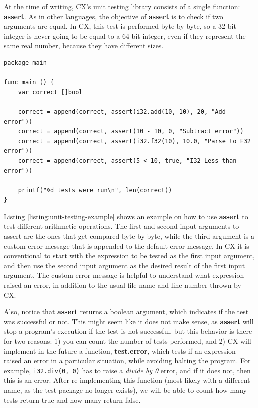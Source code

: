 \documentclass[11pt,fleqn,openany]{book} %
\begin{document}
At the time of writing, CX's unit testing library consists of a single function: \textbf{assert}. As in other languages, the objective of \textbf{assert} is to check if two arguments are equal. In CX, this test is performed byte by byte, so a 32-bit integer is never going to be equal to a 64-bit integer, even if they represent the same real number, because they have different sizes.

\begin{lstlisting}[caption={Testing using assert},captionpos=b,label={listing:unit-testing-example}]
package main

func main () {
	var correct []bool

	correct = append(correct, assert(i32.add(10, 10), 20, "Add error"))
	correct = append(correct, assert(10 - 10, 0, "Subtract error"))
	correct = append(correct, assert(i32.f32(10), 10.0, "Parse to F32 error"))
	correct = append(correct, assert(5 < 10, true, "I32 Less than error"))

	printf("%d tests were run\n", len(correct))
}
\end{lstlisting}

Listing \ref{listing:unit-testing-example} shows an example on how to use \textbf{assert} to test different arithmetic operations. The first and second input arguments to assert are the ones that get compared byte by byte, while the third argument is a custom error message that is appended to the default error message. In CX it is conventional to start with the expression to be tested as the first input argument, and then use the second input argument as the desired result of the first input argument. The custom error message is helpful to understand what expression raised an error, in addition to the usual file name and line number thrown by CX.

Also, notice that \textbf{assert} returns a boolean argument, which indicates if the test was successful or not. This might seem like it does not make sense, as \textbf{assert} will stop a program's execution if the test is not successful, but this behavior is there for two reasons: 1) you can count the number of tests performed, and 2) CX will implement in the future a function, \textbf{test.error}, which tests if an expression raised an error in a particular situation, while avoiding halting the program. For example, \lstinline{i32.div(0, 0)} has to raise a \emph{divide by 0} error, and if it does not, then this is an error. After re-implementing this function (most likely with a different name, as the test package no longer exists), we will be able to count how many tests return true and how many return false.
\end{document}

